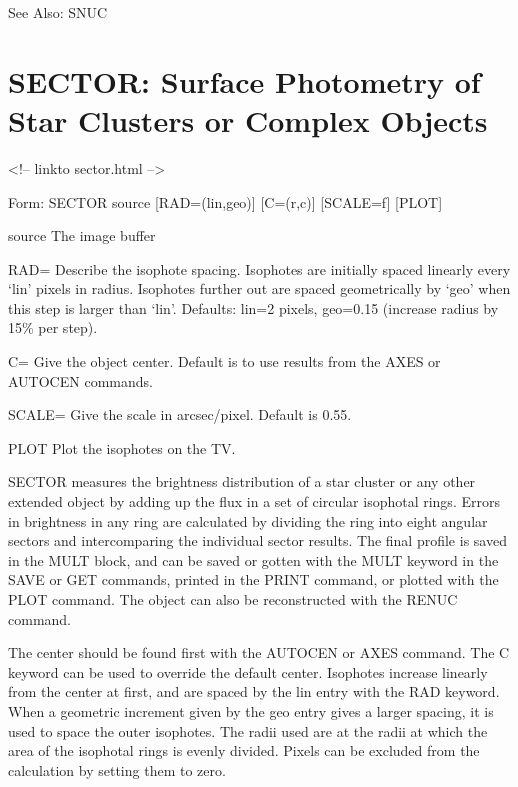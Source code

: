 See Also: SNUC


\section{SECTOR: Surface Photometry of Star Clusters or Complex Objects}
\begin{rawhtml}
<!-- linkto sector.html -->
\end{rawhtml}
\begin{command}
  \item[Form: SECTOR source {[RAD=(lin,geo)]} {[C=(r,c)]} {[SCALE=f]} 
       {[PLOT]}\hfill]{}
  \item[source]{The image buffer}
  \item[RAD=]{Describe the isophote spacing. Isophotes are initially spaced
       linearly every `lin' pixels in radius. Isophotes further out are
       spaced geometrically by `geo' when this step is larger than `lin'.
       Defaults: lin=2 pixels, geo=0.15 (increase radius by 15\% per
       step).}
  \item[C=]{Give the object center.  Default is to use results from
       the AXES or AUTOCEN commands.}
  \item[SCALE=]{Give the scale in arcsec/pixel. Default is 0.55.}
  \item[PLOT]{Plot the isophotes on the TV.}
\end{command}

SECTOR measures the brightness distribution of a star cluster or any other
extended object by adding up the flux in a set of circular isophotal rings.
Errors in brightness in any ring are calculated by dividing the ring into
eight angular sectors and intercomparing the individual sector results.
The final profile is saved in the MULT block, and can be saved or gotten
with the MULT keyword in the SAVE or GET commands, printed in the PRINT
command, or plotted with the PLOT command.  The object can also be
reconstructed with the RENUC command.

The center should be found first with the AUTOCEN or AXES command.  The C
keyword can be used to override the default center.  Isophotes increase
linearly from the center at first, and are spaced by the lin entry with the
RAD keyword.  When a geometric increment given by the geo entry gives a
larger spacing, it is used to space the outer isophotes.  The radii used
are at the radii at which the area of the isophotal rings is evenly
divided.  Pixels can be excluded from the calculation by setting them to
zero.


